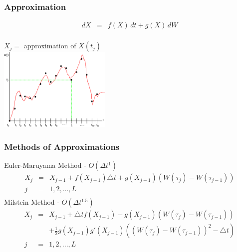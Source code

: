 \begin{frame}
   \frametitle{Approximation}
\vspace*{-3em}
	\begin{eqnarray*}
		dX &=& f(X) \, dt + g(X) \, dW \\
	\end{eqnarray*}
\vspace*{-3em}
	\begin{center}
		$X_{j} =$ approximation of $X(t_{j})$ \\ [20pt]
	\includegraphics[height=4cm]{approximation}
	\end{center}

\end{frame}



\begin{frame}
    \frametitle{Methods of Approximations}
	Euler-Maruyama Method - $O(\Delta t^{1})$
	\begin{eqnarray*}
		X_{j} &=& X_{j-1} + f(X_{j-1})\triangle t+ g(X_{j-1})(W(\tau_{j})-W(\tau_{j-1})) \\
		 j &=& 1,2,... ,L \\
	\end{eqnarray*}
	Milstein Method - $O(\Delta t^{1.5})$
	\begin{eqnarray*}
		X_{j} &=& X_{j-1} + \triangle tf(X_{j-1}) + g(X_{j-1})(W(\tau_{j})-W(\tau_{j-1})) 	\nonumber\\ 
		&& + \frac{1}{2} g(X_{j-1})g'(X_{j-1})((W(\tau_{j})-W(\tau_{j-1}))^{2}-\triangle t)\\
		 j &=& 1,2,... ,L \\
	\end{eqnarray*}
\end{frame}


